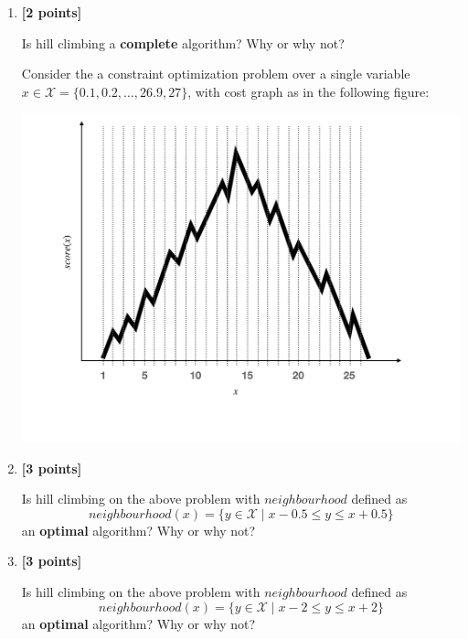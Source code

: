 \documentclass{article}
\newcounter{totalpoints}
\newcommand{\points}[1]{{\addtocounter{totalpoints}{#1}\textbf{[#1 points]}}}
\begin{document}
\begin{enumerate}
\begin{enumerate}
    \item \points{2} Is hill climbing a \textbf{complete} algorithm?  Why or why not?

    \begin{answer}{1in}
    \end{answer}
    
    \clearpage
    Consider the a constraint optimization problem over a single variable
    $x \in \mathcal{X} = \{0.1, 0.2, \ldots, 26.9, 27\}$, with cost graph as in the following figure:

    \begin{center}
    \begin{minipage}[c]{.5\textwidth}
    \includegraphics[width=.95\textwidth]{a1-q3.pdf}    
    \end{minipage}
    \end{center}
    
    \item \points{3} Is hill climbing on the above problem with $neighbourhood$ defined as
    \[ neighbourhood(x) = \{ y \in \mathcal{X} \mid x-0.5 \le y \le x+0.5 \} \]
    an \textbf{optimal} algorithm?  Why or why not?

    \begin{answer}{1.75in}
    \end{answer}

    \item \points{3} Is hill climbing on the above problem with $neighbourhood$ defined as
    \[ neighbourhood(x) = \{ y \in \mathcal{X} \mid x-2 \le y \le x+2 \} \]
    an \textbf{optimal} algorithm?  Why or why not?

    \begin{answer}{1.75in}
    \end{answer}
\end{enumerate}

\end{enumerate}
\end{document}
